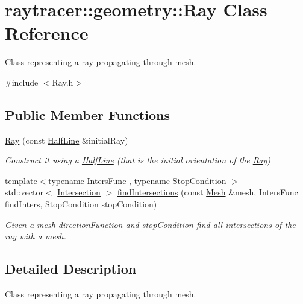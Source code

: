 \hypertarget{classraytracer_1_1geometry_1_1Ray}{}\section{raytracer\+:\+:geometry\+:\+:Ray Class Reference}
\label{classraytracer_1_1geometry_1_1Ray}


Class representing a ray propagating through mesh.  




{\ttfamily \#include $<$Ray.\+h$>$}

\subsection*{Public Member Functions}
\begin{DoxyCompactItemize}
\item 
\hyperlink{classraytracer_1_1geometry_1_1Ray_a587ca5392f26083838630091f254cbdb}{Ray} (const \hyperlink{structraytracer_1_1geometry_1_1HalfLine}{Half\+Line} \&initial\+Ray)
\begin{DoxyCompactList}\small\item\em Construct it using a \hyperlink{structraytracer_1_1geometry_1_1HalfLine}{Half\+Line} (that is the initial orientation of the \hyperlink{classraytracer_1_1geometry_1_1Ray}{Ray}) \end{DoxyCompactList}\item 
{\footnotesize template$<$typename Inters\+Func , typename Stop\+Condition $>$ }\\std\+::vector$<$ \hyperlink{structraytracer_1_1geometry_1_1Intersection}{Intersection} $>$ \hyperlink{classraytracer_1_1geometry_1_1Ray_a8440acf0af92e6c0718cb137db5e283e}{find\+Intersections} (const \hyperlink{classraytracer_1_1geometry_1_1Mesh}{Mesh} \&mesh, Inters\+Func find\+Inters, Stop\+Condition stop\+Condition)
\begin{DoxyCompactList}\small\item\em Given a mesh direction\+Function and stop\+Condition find all intersections of the ray with a mesh. \end{DoxyCompactList}\end{DoxyCompactItemize}


\subsection{Detailed Description}
Class representing a ray propagating through mesh. 

